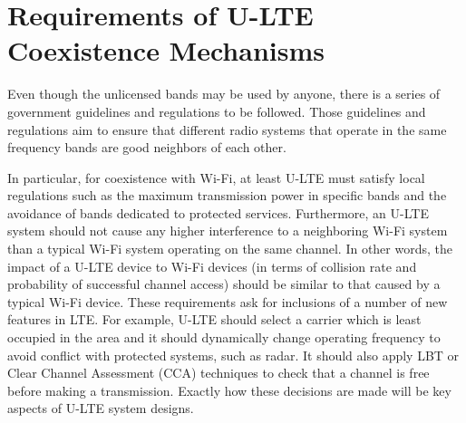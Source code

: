 \section{Requirements of U-LTE Coexistence Mechanisms}
\label{reqs}

Even though the unlicensed bands may be used by anyone, there is a series of government guidelines and regulations to be followed. Those guidelines and regulations aim to ensure that different radio systems that operate in the same frequency bands are good neighbors of each other.

In particular, for coexistence with Wi-Fi, at least U-LTE must satisfy local regulations such as the maximum transmission power in specific bands and the avoidance of bands dedicated to protected services. Furthermore, an U-LTE system should not cause any higher interference to a neighboring Wi-Fi system than a typical Wi-Fi system operating on the same channel. In other words, the impact of a U-LTE device to Wi-Fi devices (in terms of collision rate and probability of successful channel access) should be similar to that caused by a typical Wi-Fi device. These requirements ask for inclusions of a number of new features in LTE. For example, U-LTE should select a carrier which is least occupied in the area and it should dynamically change operating frequency to avoid conflict with protected systems, such as radar. It should also apply LBT or Clear Channel Assessment (CCA) techniques to check that a channel is free before making a transmission. Exactly how these decisions are made will be key aspects of U-LTE system designs.


